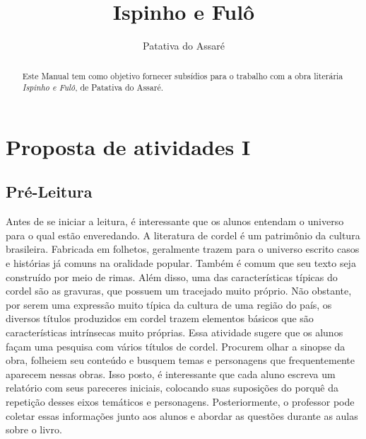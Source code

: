 \documentclass[12pt]{extarticle}
\begin{document}
\newcommand{\AutorLivro}{Patativa do Assaré}
\newcommand{\TituloLivro}{Ispinho e Fulô}
\newcommand{\Tema}{Ficção, mistério e fantasia}
\newcommand{\Genero}{Poema}
\newcommand{\imagemCapa}{./images/PNLD0033-01.png}
\newcommand{\issnppub}{---}
\newcommand{\issnepub}{---}
\newcommand{\colaborador}{\textbf{Fulano de Tal} é uma pessoa incrível e vai fazer um bom serviço.}


\title{\TituloLivro}
\author{\AutorLivro}
\def\authornotes{\colaborador}

\date{}
\maketitle


\begin{abstract}
Este Manual tem como objetivo fornecer subsídios para o trabalho com a
obra literária \emph{Ispinho e Fulô}, de Patativa do Assaré.
\end{abstract}

\tableofcontents


\section{Proposta de atividades I}

\subsection{Pré-Leitura}

Antes de se iniciar a leitura, é interessante que os alunos
entendam o universo para o qual estão enveredando. A literatura de
cordel é um patrimônio da cultura brasileira. Fabricada em folhetos,
geralmente trazem para o universo escrito casos e histórias já comuns na
oralidade popular. Também é comum que seu texto seja construído por meio
de rimas. Além disso, uma das características típicas do cordel são as
gravuras, que possuem um tracejado muito próprio. Não obstante, por
serem uma expressão muito típica da cultura de uma região do país, os
diversos títulos produzidos em cordel trazem elementos básicos que são
características intrínsecas muito próprias. Essa atividade sugere que os
alunos façam uma pesquisa com vários títulos de cordel. Procurem olhar a
sinopse da obra, folheiem seu conteúdo e busquem temas e personagens que
frequentemente aparecem nessas obras. Isso posto, é interessante que
cada aluno escreva um relatório com seus pareceres iniciais, colocando
suas suposições do porquê da repetição desses eixos temáticos e
personagens. Posteriormente, o professor pode coletar essas informações
junto aos alunos e abordar as questões durante as aulas sobre o livro.
\end{document}
